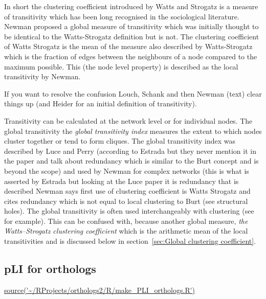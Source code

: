 In short the clustering coefficient introduced by Watts and Strogatz is a measure of transitivity which has been long recognised in the sociological literature. Newman proposed a global measure of transitivity which was initially thought to be identical to the Watts-Strogatz definition but is not. The clustering coefficient of Watts Strogatz is the mean of the measure also described by Watts-Strogatz which is the fraction of edges between the neighbours of a node compared to the maximum possible. This (the node level property) is described as the local transitivity by Newman. 

If you want to resolve the confusion Louch, Schank and then Newman (text) clear things up (and Heider for an initial definition of transitivity). 

Transitivity can be calculated at the network level or for individual nodes. The global transitivity the \textit{global transitivity index} measures the extent to which nodes cluster together or tend to form cliques. The global transitivity index was described by Luce and Perry\cite{luce1949method} (according to Estrada but they never mention it in the paper and talk about redundancy which is similar to the Burt concept and is beyond the scope) and used  by Newman for complex networks\cite{estrada2016local} (this is what is asserted by Estrada but looking at the Luce paper it is redundancy that is described Newman says first use of clustering coefficient is Watts Strogatz and cites redundancy which is not equal to local clustering to Burt (see structural holes). The global transitivity is often used interchangeably with clustering (see \cite{newman2003social} for example). This can be confused with, because another global measure, \textit{the Watts–Strogatz clustering coefficient} \cite{watts1998collective} which is the arithmetic mean of the local transitivities and is discussed below in section~\ref{sec:Global clustering coefficient}. 

\subsection{pLI for orthologs} \url{source('~/RProjects/orthologs2/R/make_PLI_orthologs.R')}


